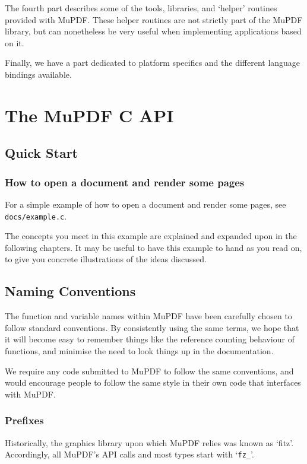 \documentclass[oneside]{book}
\begin{document}
The fourth part describes some of the tools, libraries, and `helper' routines provided with MuPDF. These helper routines are not strictly part of the MuPDF library, but can nonetheless be very useful when implementing applications based on it.

Finally, we have a part dedicated to platform specifics and the different language bindings available.

\part{The MuPDF C API}

\chapter{Quick Start}

\section{How to open a document and render some pages}

For a simple example of how to open a document and render some pages, see \texttt{docs/example.c}.

The concepts you meet in this example are explained and expanded upon in the following chapters. It may be useful to have this example to hand as you read on, to give you concrete illustrations of the ideas discussed.


\chapter{Naming Conventions}

The function and variable names within MuPDF have been carefully chosen to follow standard conventions. By consistently using the same terms, we hope that it will become easy to remember things like the reference counting behaviour of functions, and minimise the need to look things up in the documentation.

We require any code submitted to MuPDF to follow the same conventions, and would encourage people to follow the same style in their own code that interfaces with MuPDF.

\section{Prefixes}

Historically, the graphics library upon which MuPDF relies was known as `fitz'. Accordingly, all MuPDF's API calls and most types start with `\texttt{fz\_}'.
\end{document}

